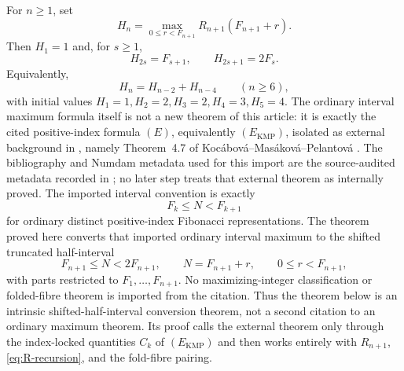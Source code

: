 \begin{theorem}
\label{thm:half-interval-fibonacci-representation-max}
For \(n\ge1\), set
\[
  H_n=\max_{0\le r<F_{n+1}} R_{n+1}(F_{n+1}+r).
\]
Then \(H_1=1\) and, for \(s\ge1\),
\[
  H_{2s}=F_{s+1},\qquad H_{2s+1}=2F_s .
\]
Equivalently,
\[
  H_n=H_{n-2}+H_{n-4}\qquad(n\ge6),
\]
with initial values \(H_1=1,H_2=2,H_3=2,H_4=3,H_5=4\).
The ordinary interval maximum formula itself is not a new theorem of this
article: it is exactly the cited positive-index formula \((E)\), equivalently
\((E_{\mathrm{KMP}})\), isolated as external background in
, namely Theorem~4.7 of
Koc\'abov\'a--Mas\'akov\'a--Pelantov\'a
\cite[Thm.~4.7]{KocabovaMasakovaPelantova2005}.  The bibliography and Numdam
metadata used for this import are the source-audited metadata recorded in
; no later step treats that
external theorem as internally proved.  The imported interval convention is
exactly
\[
  F_k\le N<F_{k+1}
\]
for ordinary distinct positive-index Fibonacci representations.  The theorem
proved here converts that imported ordinary interval maximum to the shifted
truncated half-interval
\[
  F_{n+1}\le N<2F_{n+1},
  \qquad N=F_{n+1}+r,\qquad 0\le r<F_{n+1},
\]
with parts restricted to \(F_1,\ldots,F_{n+1}\).  No maximizing-integer
classification or folded-fibre theorem is imported from the citation.
Thus the theorem below is an intrinsic shifted-half-interval conversion theorem,
not a second citation to an ordinary maximum theorem.  Its proof calls the
external theorem only through the index-locked quantities \(C_k\) of
\((E_{\mathrm{KMP}})\) and then works entirely with \(R_{n+1}\),
\eqref{eq:R-recursion}, and the fold-fibre pairing.
\end{theorem}

